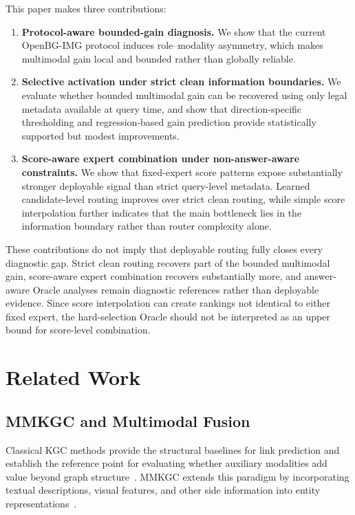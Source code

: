 \documentclass[11pt]{article}
\begin{document}
This paper makes three contributions:
\begin{enumerate}[leftmargin=1.5em]
    \item \textbf{Protocol-aware bounded-gain diagnosis.} We show that the current OpenBG-IMG protocol induces role--modality asymmetry, which makes multimodal gain local and bounded rather than globally reliable.
    \item \textbf{Selective activation under strict clean information boundaries.} We evaluate whether bounded multimodal gain can be recovered using only legal metadata available at query time, and show that direction-specific thresholding and regression-based gain prediction provide statistically supported but modest improvements.
    \item \textbf{Score-aware expert combination under non-answer-aware constraints.} We show that fixed-expert score patterns expose substantially stronger deployable signal than strict query-level metadata. Learned candidate-level routing improves over strict clean routing, while simple score interpolation further indicates that the main bottleneck lies in the information boundary rather than router complexity alone.
\end{enumerate}

These contributions do not imply that deployable routing fully closes every diagnostic gap. Strict clean routing recovers part of the bounded multimodal gain, score-aware expert combination recovers substantially more, and answer-aware Oracle analyses remain diagnostic references rather than deployable evidence. Since score interpolation can create rankings not identical to either fixed expert, the hard-selection Oracle should not be interpreted as an upper bound for score-level combination.

\section{Related Work}
\subsection{MMKGC and Multimodal Fusion}
Classical KGC methods provide the structural baselines for link prediction and establish the reference point for evaluating whether auxiliary modalities add value beyond graph structure~\cite{nickel2011rescal,bordes2013transe,yang2015distmult,trouillon2016complex,dettmers2018conve,sun2019rotate,balazevic2019tucker,schlichtkrull2018rgcn,vashishth2020compgcn}. MMKGC extends this paradigm by incorporating textual descriptions, visual features, and other side information into entity representations~\cite{xie2017ikrl,mousselly2018multimodal,pezeshkpour2018mkbe,liu2019mmkg}.
\end{document}

